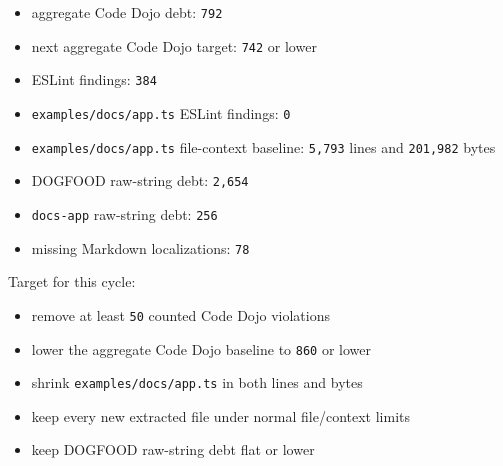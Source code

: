 \begin{itemize}
\tightlist
\item
  aggregate Code Dojo debt: \texttt{7\allowbreak{}9\allowbreak{}2}
\item
  next aggregate Code Dojo target: \texttt{7\allowbreak{}4\allowbreak{}2} or lower
\item
  ESLint findings: \texttt{3\allowbreak{}8\allowbreak{}4}
\item
  \texttt{e\allowbreak{}x\allowbreak{}a\allowbreak{}m\allowbreak{}p\allowbreak{}l\allowbreak{}e\allowbreak{}s\allowbreak{}/\allowbreak{}d\allowbreak{}o\allowbreak{}c\allowbreak{}s\allowbreak{}/\allowbreak{}a\allowbreak{}p\allowbreak{}p\allowbreak{}.\allowbreak{}t\allowbreak{}s} ESLint findings: \texttt{0}
\item
  \texttt{e\allowbreak{}x\allowbreak{}a\allowbreak{}m\allowbreak{}p\allowbreak{}l\allowbreak{}e\allowbreak{}s\allowbreak{}/\allowbreak{}d\allowbreak{}o\allowbreak{}c\allowbreak{}s\allowbreak{}/\allowbreak{}a\allowbreak{}p\allowbreak{}p\allowbreak{}.\allowbreak{}t\allowbreak{}s} file-context baseline: \texttt{5\allowbreak{},\allowbreak{}7\allowbreak{}9\allowbreak{}3} lines and \texttt{2\allowbreak{}0\allowbreak{}1\allowbreak{},\allowbreak{}9\allowbreak{}8\allowbreak{}2} bytes
\item
  DOGFOOD raw-string debt: \texttt{2\allowbreak{},\allowbreak{}6\allowbreak{}5\allowbreak{}4}
\item
  \texttt{d\allowbreak{}o\allowbreak{}c\allowbreak{}s\allowbreak{}-\allowbreak{}a\allowbreak{}p\allowbreak{}p} raw-string debt: \texttt{2\allowbreak{}5\allowbreak{}6}
\item
  missing Markdown localizations: \texttt{7\allowbreak{}8}
\end{itemize}

Target for this cycle:

\begin{itemize}
\tightlist
\item
  remove at least \texttt{5\allowbreak{}0} counted Code Dojo violations
\item
  lower the aggregate Code Dojo baseline to \texttt{8\allowbreak{}6\allowbreak{}0} or lower
\item
  shrink \texttt{e\allowbreak{}x\allowbreak{}a\allowbreak{}m\allowbreak{}p\allowbreak{}l\allowbreak{}e\allowbreak{}s\allowbreak{}/\allowbreak{}d\allowbreak{}o\allowbreak{}c\allowbreak{}s\allowbreak{}/\allowbreak{}a\allowbreak{}p\allowbreak{}p\allowbreak{}.\allowbreak{}t\allowbreak{}s} in both lines and bytes
\item
  keep every new extracted file under normal file/context limits
\item
  keep DOGFOOD raw-string debt flat or lower
\end{itemize}

